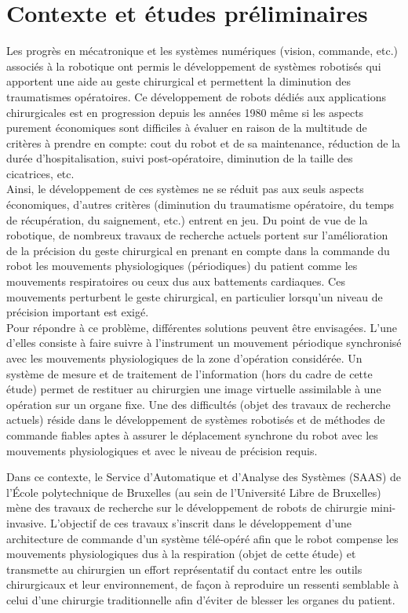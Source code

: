 \section{Contexte et études préliminaires}
\ifprof
\else
Les progrès en mécatronique et les systèmes numériques (vision, commande, etc.) associés à la robotique ont permis le développement de systèmes robotisés qui apportent une aide au geste chirurgical et permettent la diminution des traumatismes opératoires. Ce développement de robots dédiés aux applications chirurgicales est en progression depuis les années 1980 même si les aspects purement économiques sont difficiles à évaluer en raison de la multitude de critères à prendre en compte: cout du robot et de sa maintenance, réduction de la durée d'hospitalisation, suivi post-opératoire, diminution de la taille des cicatrices, etc.\\
Ainsi, le développement de ces systèmes ne se réduit pas aux seuls aspects économiques, d'autres critères (diminution du traumatisme opératoire, du temps de récupération, du saignement, etc.) entrent en jeu. Du point de vue de la robotique, de nombreux travaux de recherche actuels portent sur l'amélioration de la précision du geste chirurgical en prenant en compte dans la commande du robot les mouvements physiologiques (périodiques) du patient comme les mouvements respiratoires ou ceux dus aux battements cardiaques. Ces mouvements perturbent le geste chirurgical, en particulier lorsqu'un niveau de précision important est exigé.\\
Pour répondre à ce problème, différentes solutions peuvent être envisagées. L'une d'elles consiste à faire suivre à l'instrument un mouvement périodique synchronisé avec les mouvements physiologiques de la zone d'opération considérée. Un système de mesure et de traitement de l'information (hors du cadre de cette étude) permet de restituer au chirurgien une image virtuelle assimilable à une opération sur un organe fixe. Une des difficultés (objet des travaux de recherche actuels) réside dans le développement de systèmes robotisés et de méthodes de commande fiables aptes à assurer le déplacement synchrone du robot avec les mouvements physiologiques et avec le niveau de précision requis.

Dans ce contexte, le Service d'Automatique et d'Analyse des Systèmes (SAAS) de l'École polytechnique de Bruxelles (au sein de l'Université Libre de Bruxelles) mène des travaux de recherche sur le développement de robots de chirurgie mini-invasive. L'objectif de ces travaux s'inscrit dans le développement d'une architecture de commande d'un système télé-opéré afin que le robot compense les mouvements physiologiques dus à la respiration (objet de cette étude) et transmette au chirurgien un effort représentatif du contact entre les outils chirurgicaux et leur environnement, de façon à reproduire un ressenti semblable à celui d'une chirurgie traditionnelle afin d'éviter de blesser les organes du patient.

